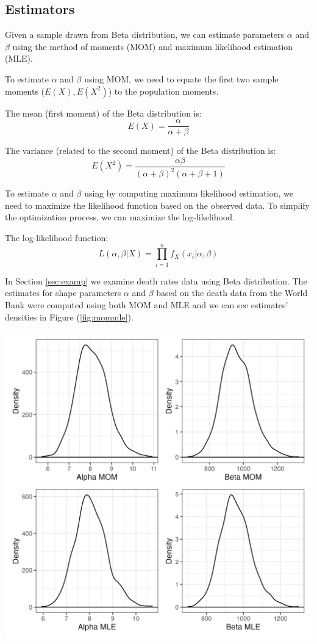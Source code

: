 \documentclass{article}\usepackage[]{graphicx}\usepackage[]{xcolor}
\newenvironment{Figure}
  {\par\medskip\noindent\minipage{\linewidth}}
  {\endminipage\par\medskip}
\begin{document}
\begin{multicols}{2}
\section{Estimators}\label{sec:estim}

Given a sample drawn from Beta distribution, we can estimate parameters $\alpha$ and $\beta$ using the method of moments (MOM) and maximum likelihood estimation (MLE).

To estimate $\alpha$ and $\beta$ using MOM, we need to equate the first two sample moments ($E(X), E(X^2)$) to the population moments.

The mean (first moment) of the Beta distribution is:
$$E(X) = \frac{\alpha}{\alpha + \beta}$$

The variance (related to the second moment) of the Beta distribution is:
$$E(X^2) = \frac{\alpha \beta}{(\alpha + \beta)^2 (\alpha + \beta + 1)}$$

To estimate $\alpha$ and $\beta$ using by computing maximum likelihood estimation, we need to maximize the likelihood function based on the observed data. To simplify the optimization process, we can maximize the log-likelihood.

The log-likelihood function:
$$L(\alpha, \beta | X) = \prod_{i=1}^{n} f_X(x_i| \alpha, \beta)$$

In Section \ref{sec:examp} we examine death rates data using Beta distribution. The estimates for shape parameters $\alpha$ and $\beta$ based on the death data from the World Bank were computed using both MOM and MLE and we can see estimates' densities in Figure (\ref{fig:mommle}).

\begin{Figure}
 \centering
 \includegraphics[width=\linewidth]{mommle.png}
 \label{fig:mommle}
\end{Figure}


\end{multicols}
\end{document}
